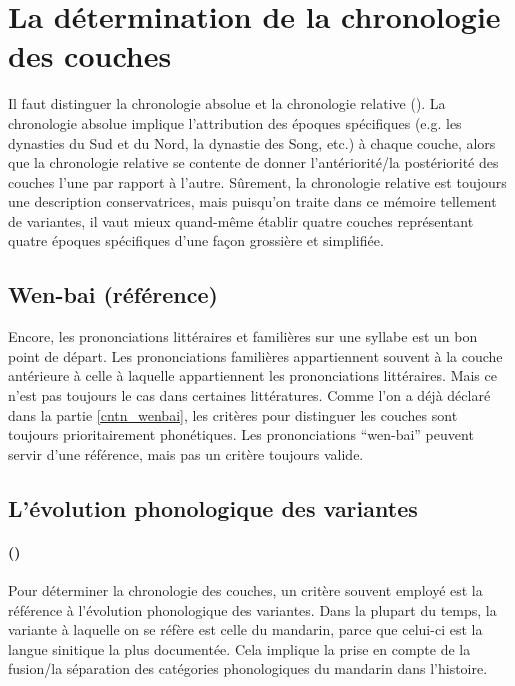 \documentclass{scrbook}
\newcounter{c}[subsubsection]
\newcommand{\stpc}[1]{\stepcounter{#1}}
\begin{document}
\begin{sloppypar}
\section{La détermination de la chronologie des couches}\label{chrnlg_couche}
Il faut distinguer la chronologie absolue et la chronologie relative (\cite[123]{Chen2005couche}). La chronologie absolue implique l'attribution des époques spécifiques (e.g. les dynasties du Sud et du Nord, la dynastie des Song, etc.) à chaque couche, alors que la chronologie relative se contente de donner l'antériorité/la postériorité des couches l'une par rapport à l'autre. Sûrement, la chronologie relative est toujours une description conservatrices, mais puisqu'on traite dans ce mémoire tellement de variantes, il vaut mieux quand-même établir quatre couches représentant quatre époques spécifiques d'une façon grossière et simplifiée. 

\subsection{Wen-bai (référence)}
Encore, les prononciations littéraires et familières sur une syllabe est un bon point de départ. Les prononciations familières appartiennent souvent à la couche antérieure à celle à laquelle appartiennent les prononciations littéraires. Mais ce n'est pas toujours le cas dans certaines littératures. Comme l'on a déjà déclaré dans la partie \ref{cntn_wenbai}, les critères pour distinguer les couches sont toujours prioritairement phonétiques. Les prononciations ``wen-bai'' peuvent servir d'une référence, mais pas un critère toujours valide. %

\subsection{L'évolution phonologique des variantes}
\stpc{c}\paragraph{()}
Pour déterminer la chronologie des couches, un critère souvent employé est la référence à l'évolution phonologique des variantes. Dans la plupart du temps, la variante à laquelle on se réfère est celle du mandarin, parce que celui-ci est la langue sinitique la plus documentée. Cela implique la prise en compte de la fusion/la séparation des catégories phonologiques du mandarin dans l'histoire. 


\end{sloppypar}
\end{document}

